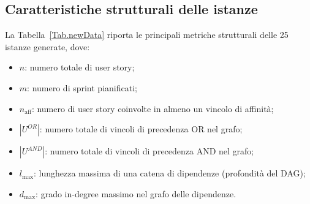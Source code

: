 \documentclass[12pt,a4paper,openright,twoside]{book}
\begin{document}
\subsection{Caratteristiche strutturali delle istanze}

La Tabella~\ref{Tab.newData} riporta le principali metriche strutturali delle 25 istanze generate, dove:
\begin{itemize}
    \item $n$: numero totale di user story;
    \item $m$: numero di sprint pianificati;
    \item $n_{\text{aff}}$: numero di user story coinvolte in almeno un vincolo di affinità;
    \item $|U^{OR}|$: numero totale di vincoli di precedenza OR nel grafo;
    \item $|U^{AND}|$: numero totale di vincoli di precedenza AND nel grafo;
    \item $l_{\max}$: lunghezza massima di una catena di dipendenze (profondità del DAG);
    \item $d_{\max}$: grado in-degree massimo nel grafo delle dipendenze.
\end{itemize}
\end{document}
